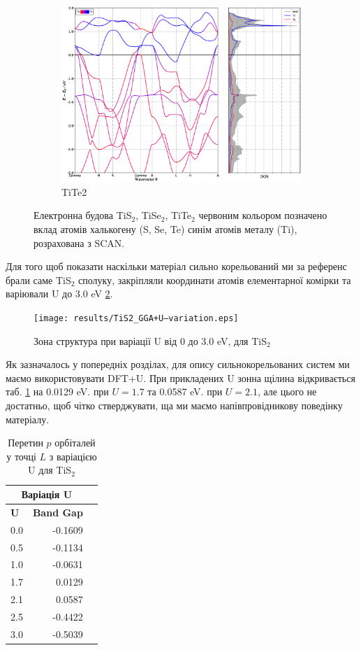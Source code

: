 \begin{figure}[H]
\begin{subfigure}[b]{.4\textwidth}
    	\includegraphics[width=\linewidth]{img/results/TiTe2_SCAN_relaxed_BAND+DOS}
    	\caption{
    	TiTe2}
	\end{subfigure}
\caption{Електронна будова TiS$_2$, TiSe$_2$, TiTe$_2$ червоним кольором позначено вклад атомів халькогену (S, Se, Te) синім атомів металу (Ti), розрахована з SCAN.}
\label{fig:bandstructireSCAN}
\end{figure}

Для того щоб показати наскільки матеріал сильно корельований ми за референс брали саме TiS$_2$ сполуку, закріпляли координати атомів елементарної комірки та варіювали U до 3.0 eV \ref{fig:variationU_GGA}. 

\begin{figure}
	\texttt{[image: results/TiS2\_GGA+U--variation.eps]}
	\caption{Зона структура при варіації U від 0 до 3.0 eV, для TiS$_2$}
	\label{fig:variationU_GGA}
\end{figure}

Як зазначалось у попередніх розділах, для опису сильнокорельованих систем ми маємо використовувати DFT+U. При прикладених U зонна щілина відкривається таб. \ref{tab:VariationU} на 0.0129 eV. при $U=1.7$ та 0.0587 eV. при $U=2.1$, але цього не достатньо, щоб чітко стверджувати, ща ми маємо напівпровідникову поведінку матеріалу. 

\begin{table}[H]\centering
\scriptsize
\begin{tabular}{lrr}\toprule
\multicolumn{2}{c}{\textbf{Варіація U }} \\\midrule
\multirow{2}{*}{\textbf{U}} &\multirow{2}{*}{\textbf{Band Gap}} \\
& \\
0.0 & -0.1609 \\
0.5 &-0.1134 \\
1.0 &-0.0631 \\
1.7 &0.0129 \\
2.1 &0.0587 \\
2.5 &-0.4422 \\
3.0 &-0.5039 \\
\bottomrule
\end{tabular}
\caption{Перетин $p$ орбіталей у точці $L$ з варіацією U для TiS$_2$}\label{tab:VariationU}
\end{table}

